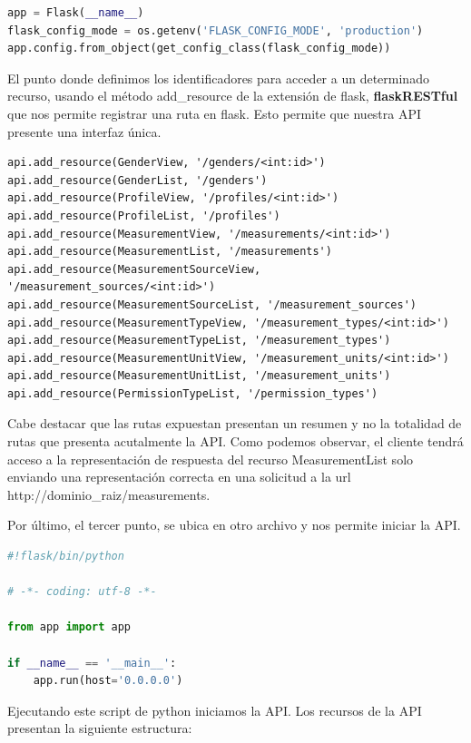 \documentclass[a4paper,12pt]{article}
\begin{document}
\begin{itemize}
\begin{lstlisting}[language=Python]
app = Flask(__name__)
flask_config_mode = os.getenv('FLASK_CONFIG_MODE', 'production')
app.config.from_object(get_config_class(flask_config_mode))
\end{lstlisting}

El punto donde definimos los identificadores para acceder a un determinado recurso, usando el método add\_resource de la extensión de flask, \textbf{flaskRESTful} que nos permite registrar una ruta en flask. Esto permite que nuestra API presente una interfaz única.

\begin{lstlisting}
api.add_resource(GenderView, '/genders/<int:id>')
api.add_resource(GenderList, '/genders')
api.add_resource(ProfileView, '/profiles/<int:id>')
api.add_resource(ProfileList, '/profiles')
api.add_resource(MeasurementView, '/measurements/<int:id>')
api.add_resource(MeasurementList, '/measurements')
api.add_resource(MeasurementSourceView, '/measurement_sources/<int:id>')
api.add_resource(MeasurementSourceList, '/measurement_sources')
api.add_resource(MeasurementTypeView, '/measurement_types/<int:id>')
api.add_resource(MeasurementTypeList, '/measurement_types')
api.add_resource(MeasurementUnitView, '/measurement_units/<int:id>')
api.add_resource(MeasurementUnitList, '/measurement_units')
api.add_resource(PermissionTypeList, '/permission_types')
\end{lstlisting}

Cabe destacar que las rutas expuestan presentan un resumen y no la totalidad de rutas que presenta acutalmente la API.
Como podemos observar, el cliente tendrá acceso a la representación de respuesta del recurso MeasurementList solo enviando una representación correcta en una solicitud a la url http://dominio\_raiz/measurements.

Por último, el tercer punto, se ubica en otro archivo y nos permite iniciar la API.

\begin{lstlisting}[language=Python]
#!flask/bin/python

# -*- coding: utf-8 -*-

from app import app

if __name__ == '__main__':
    app.run(host='0.0.0.0')
\end{lstlisting}

Ejecutando este script de python iniciamos la API.
Los recursos de la API presentan la siguiente estructura:


\end{itemize}
\end{document}
